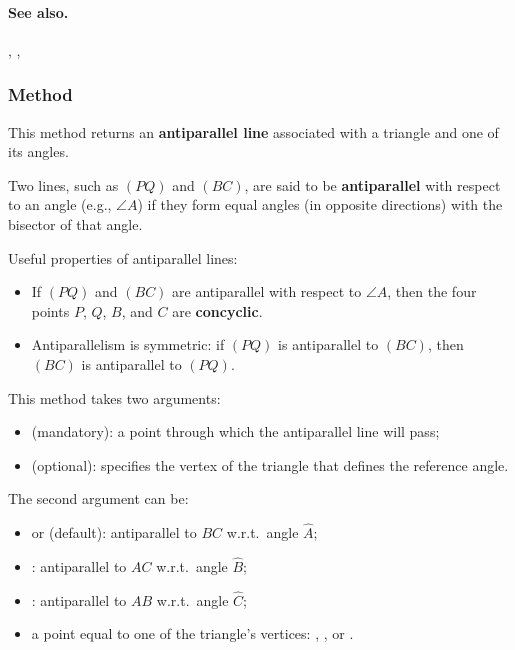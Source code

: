 \paragraph{See also.} , , 




\subsubsection{Method } %
\label{antiparallel}

This method returns an \textbf{antiparallel line} associated with a triangle and one of its angles.

\medskip
\noindent
Two lines, such as $(PQ)$ and $(BC)$, are said to be \textbf{antiparallel} with respect to an angle (e.g., $\angle A$) if they form equal angles (in opposite directions) with the bisector of that angle.

\medskip
\noindent
Useful properties of antiparallel lines:
\begin{itemize}
  \item If $(PQ)$ and $(BC)$ are antiparallel with respect to $\angle A$, then the four points $P$, $Q$, $B$, and $C$ are \textbf{concyclic}.
  \item Antiparallelism is symmetric: if $(PQ)$ is antiparallel to $(BC)$, then $(BC)$ is antiparallel to $(PQ)$.
\end{itemize}

\medskip
\noindent
This method takes two arguments:
\begin{itemize}
  \item {} (mandatory): a point through which the antiparallel line will pass;
  \item {} (optional): specifies the vertex of the triangle that defines the reference angle.
\end{itemize}

\noindent
The second argument  can be:
\begin{itemize}
  \item {} or  (default): antiparallel to $BC$ w.r.t.\ angle $\widehat{A}$;
  \item {}: antiparallel to $AC$ w.r.t.\ angle $\widehat{B}$;
  \item {}: antiparallel to $AB$ w.r.t.\ angle $\widehat{C}$;
  \item a point equal to one of the triangle’s vertices: , , or .
\end{itemize}

